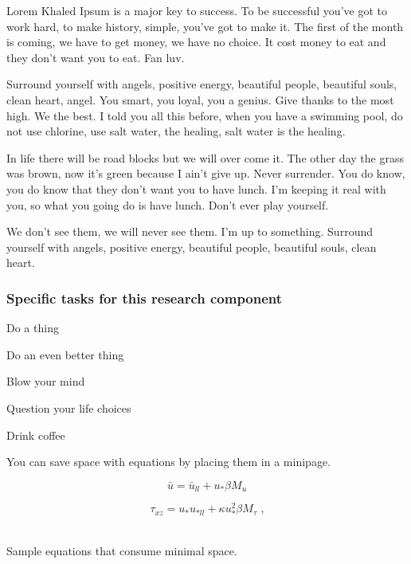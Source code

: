 \documentclass[nsfdescription]{nsfproposal}
\begin{document}
Lorem Khaled Ipsum is a major key to success. To be successful you've got to work hard, \citep{jung-burd-2017-season} to make history, simple, you've got to make it. The first of the month is coming, we have to get money, we have no choice. It cost money to eat and they don't want you to eat. Fan luv.

Surround yourself with angels, positive energy, beautiful people, beautiful souls, clean heart, angel. You smart, you loyal, you a genius. Give thanks to the most high. We the best. I told you all this before, when you have a swimming pool, do not use chlorine, use salt water, the healing, salt water is the healing.

In life there will be road blocks but we will over come it. The other day the grass was brown, now it's green because I ain't give up. Never surrender. You do know, you do know that they don't want you to have lunch. I'm keeping it real with you, so what you going do is have lunch. Don't ever play yourself.

We don't see them, we will never see them. I'm up to something. Surround yourself with angels, positive energy, beautiful people, beautiful souls, clean heart.


\subsubsection{Specific tasks for this research component}
\begin{compactitem}
	\item Do a thing
	\item Do an even better thing
	\item Blow your mind
	\item Question your life choices
	\item Drink coffee
\end{compactitem}

You can save space with equations by placing them in a minipage. 

\begin{center}
	\begin{minipage}{.3\textwidth}
		\begin{equation}
 			\bar u = \bar u_{ll} + u_* \beta M_{u} \label{new_u}
		\end{equation}
	\end{minipage}
	\begin{minipage}{.36\linewidth}
		\begin{equation}
			  \tau_{xz} = u_* u_{*ll} + \kappa u_*^2 \beta M_{\tau} \label{new_tau} \mbox{ ,}
		\end{equation}
	\end{minipage}

	~\\Sample equations that consume minimal space.
\end{center}
\end{document}
